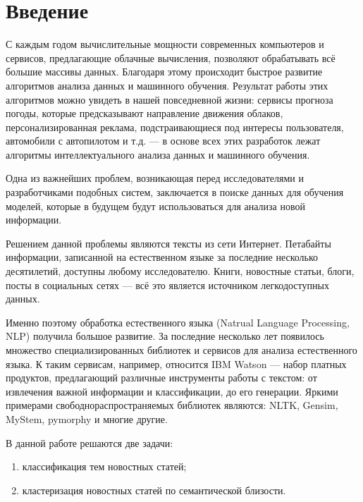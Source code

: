 \documentclass[a4paper, 14pt]{extarticle}
\begin{document}

\section{Введение}
С каждым годом вычислительные мощности современных компьютеров и сервисов, 
предлагающие облачные вычисления, позволяют 
обрабатывать всё большие массивы данных. Благодаря этому происходит быстрое 
развитие алгоритмов анализа данных и машинного обучения. Результат работы 
этих алгоритмов можно увидеть в нашей повседневной жизни: 
сервисы прогноза погоды, которые предсказывают направление движения 
облаков, персонализированная реклама, подстраивающиеся под 
интересы пользователя, автомобили с автопилотом и т.д. --- в основе всех 
этих разработок лежат алгоритмы интеллектуального анализа данных и 
машинного обучения.

Одна из важнейших проблем, возникающая перед исследователями и 
разработчиками подобных систем, заключается в поиске данных для обучения моделей,
которые в будущем будут использоваться для анализа новой информации.

Решением данной проблемы являются тексты из сети Интернет.
Петабайты информации, записанной на естественном языке за последние несколько 
десятилетий, доступны любому исследователю. Книги, новостные статьи, блоги, посты в 
социальных сетях --- всё это является источником легкодоступных данных.

Именно поэтому обработка естественного языка (Natrual Language Processing, 
NLP) получила большое развитие. За последние несколько лет появилось множество 
специализированных библиотек и сервисов для анализа естественного языка. К таким сервисам, 
например, относится IBM Watson --- набор платных продуктов, предлагающий различные
инструменты работы с текстом: от извлечения важной информации и 
классификации, до его генерации. %
Яркими примерами свободнораспространяемых библиотек являются: NLTK, Gensim, MyStem,
pymorphy и многие другие.

В данной работе решаются две задачи:
\begin{enumerate}
	\item классификация тем новостных статей;
	\item кластеризация новостных статей по семантической близости.
\end{enumerate} 
\end{document}

